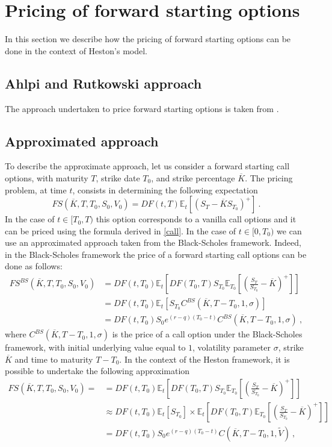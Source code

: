 \section{Pricing of forward starting options}
In this section we describe how the pricing of forward starting options can be done in the context of Heston's model. 

\subsection{Ahlpi and Rutkowski approach}
The approach undertaken to price forward starting options is taken from \cite{ahlip2009forward}.


\subsection{Approximated approach}
To describe the approximate approach, let us consider a forward starting call options, with maturity $T$, strike date $T_0$, and strike percentage $\overline{K}$. 
The pricing problem, at time $t$, consists in determining the following expectation
$$
FS(\overline{K}, T, T_0, S_0, V_0)  = DF(t,T) \mathbb{E}_t   \left[\left(S_T - \overline{K} S_{T_0}\right)^+\right] \ .
$$
In the case of $t \in [T_0, T)$ this option corresponds to a vanilla call options and it can be priced using the formula derived in \ref{call}. 
In the case of $t \in [0, T_0)$ we can use an approximated approach taken from the Black-Scholes framework. 
Indeed, in the Black-Scholes framework the price of a forward starting call options can be done as follows:
$$
\begin{aligned}
FS^{BS}(\overline{K}, T, T_0, S_0, V_0) 
&= DF(t,T_0)  \mathbb{E}_t   \left[ DF(T_0,T) S_{T_0}  \mathbb{E}_{T_0} \left[ \left( \frac{S_T}{S_{T_0}} - \overline{K}\right)^+\right]       \right]
\\
&=
DF(t,T_0) \mathbb{E}_t \left[ S_{T_0}  C^{BS}(\overline{K}, T-T_0, 1 ,\sigma) \right] 
\\ &=DF(t,T_0) S_0 e^{(r-q) (T_0-t)}   C^{BS}(\overline{K}, T-T_0, 1 ,\sigma) \ , 
\end{aligned}
$$
where $C^{BS}(\overline{K}, T-T_0, 1 , \sigma)$ is the price of a call option under the Black-Scholes framework, with initial underlying value equal to $1$, volatility parameter $\sigma$, strike $\overline{K}$ and time to maturity $T-T_0$.
In the context of the Heston framework, it is possible to undertake the following approximation
$$
\begin{aligned}
FS(\overline{K}, T, T_0, S_0, V_0) = 
&= DF(t,T_0) \mathbb{E}_t   \left[ DF(T_0,T) S_{T_0}   \mathbb{E}_{T_0} \left[ \left( \frac{S_T}{S_{T_0}} - \overline{K}\right)^+\right]       \right]
\\
&\approx DF(t,T_0)  \mathbb{E}_t   \left[  S_{T_0}  \right] \times \mathbb{E}_t \left[ DF(T_0,T) \mathbb{E}_{T_0} \left[ \left( \frac{S_T}{S_{T_0}} - \overline{K}\right)^+\right]       \right]
\\ 
&=
DF(t,T_0)  S_0 e^{(r-q) (T_0-t)}   C(\overline{K}, T-T_0, 1, \tilde{V}) \ , 
\end{aligned}
$$
